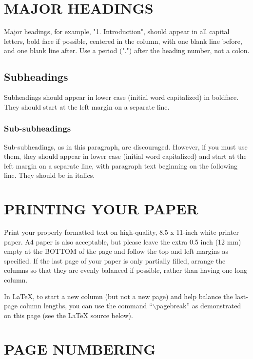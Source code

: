 \documentclass{article}
\begin{document}
\section{MAJOR HEADINGS}
\label{sec:majhead}

Major headings, for example, "1. Introduction", should appear in all capital
letters, bold face if possible, centered in the column, with one blank line
before, and one blank line after. Use a period (".") after the heading number,
not a colon.

\subsection{Subheadings}
\label{ssec:subhead}

Subheadings should appear in lower case (initial word capitalized) in
boldface.  They should start at the left margin on a separate line.

\subsubsection{Sub-subheadings}
\label{sssec:subsubhead}

Sub-subheadings, as in this paragraph, are discouraged. However, if you
must use them, they should appear in lower case (initial word
capitalized) and start at the left margin on a separate line, with paragraph
text beginning on the following line.  They should be in italics.

\section{PRINTING YOUR PAPER}
\label{sec:print}

Print your properly formatted text on high-quality, 8.5 x 11-inch white printer
paper. A4 paper is also acceptable, but please leave the extra 0.5 inch (12 mm)
empty at the BOTTOM of the page and follow the top and left margins as
specified.  If the last page of your paper is only partially filled, arrange
the columns so that they are evenly balanced if possible, rather than having
one long column.

In LaTeX, to start a new column (but not a new page) and help balance the
last-page column lengths, you can use the command ``$\backslash$pagebreak'' as
demonstrated on this page (see the LaTeX source below).

\section{PAGE NUMBERING}
\label{sec:page}
\end{document}
